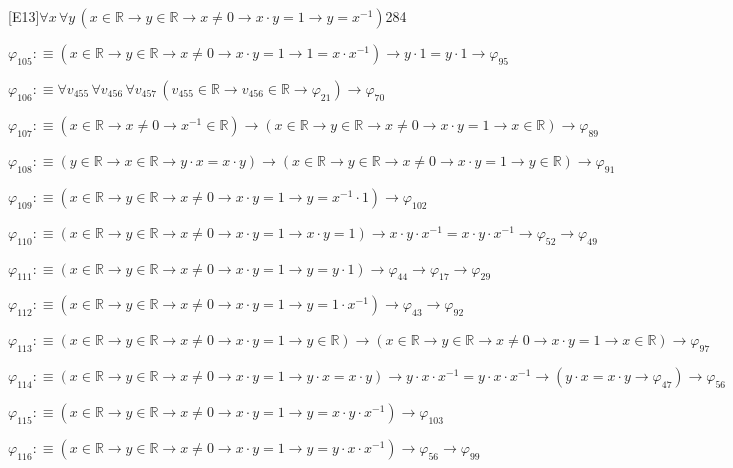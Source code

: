 \begin{fullproof}{[E13]}{$\forall x\,\forall y\,(x \in \mathbb{R} \to y \in \mathbb{R} \to x \neq 0 \to x \cdot y = 1 \to y = x^{-1})$}{284}
\begin{abbrevlist}
\item $\varphi_{105} :\equiv (x \in \mathbb{R} \to y \in \mathbb{R} \to x \neq 0 \to x \cdot y = 1 \to 1 = x \cdot x^{-1}) \to y \cdot 1 = y \cdot 1 \to \varphi_{95}$
\item $\varphi_{106} :\equiv \forall v_{455}\,\forall v_{456}\,\forall v_{457}\,(v_{455} \in \mathbb{R} \to v_{456} \in \mathbb{R} \to \varphi_{21}) \to \varphi_{70}$
\item $\varphi_{107} :\equiv (x \in \mathbb{R} \to x \neq 0 \to x^{-1} \in \mathbb{R}) \to (x \in \mathbb{R} \to y \in \mathbb{R} \to x \neq 0 \to x \cdot y = 1 \to x \in \mathbb{R}) \to \varphi_{89}$
\item $\varphi_{108} :\equiv (y \in \mathbb{R} \to x \in \mathbb{R} \to y \cdot x = x \cdot y) \to (x \in \mathbb{R} \to y \in \mathbb{R} \to x \neq 0 \to x \cdot y = 1 \to y \in \mathbb{R}) \to \varphi_{91}$
\item $\varphi_{109} :\equiv (x \in \mathbb{R} \to y \in \mathbb{R} \to x \neq 0 \to x \cdot y = 1 \to y = x^{-1} \cdot 1) \to \varphi_{102}$
\item $\varphi_{110} :\equiv (x \in \mathbb{R} \to y \in \mathbb{R} \to x \neq 0 \to x \cdot y = 1 \to x \cdot y = 1) \to x \cdot y \cdot x^{-1} = x \cdot y \cdot x^{-1} \to \varphi_{52} \to \varphi_{49}$
\item $\varphi_{111} :\equiv (x \in \mathbb{R} \to y \in \mathbb{R} \to x \neq 0 \to x \cdot y = 1 \to y = y \cdot 1) \to \varphi_{44} \to \varphi_{17} \to \varphi_{29}$
\item $\varphi_{112} :\equiv (x \in \mathbb{R} \to y \in \mathbb{R} \to x \neq 0 \to x \cdot y = 1 \to y = 1 \cdot x^{-1}) \to \varphi_{43} \to \varphi_{92}$
\item $\varphi_{113} :\equiv (x \in \mathbb{R} \to y \in \mathbb{R} \to x \neq 0 \to x \cdot y = 1 \to y \in \mathbb{R}) \to (x \in \mathbb{R} \to y \in \mathbb{R} \to x \neq 0 \to x \cdot y = 1 \to x \in \mathbb{R}) \to \varphi_{97}$
\item $\varphi_{114} :\equiv (x \in \mathbb{R} \to y \in \mathbb{R} \to x \neq 0 \to x \cdot y = 1 \to y \cdot x = x \cdot y) \to y \cdot x \cdot x^{-1} = y \cdot x \cdot x^{-1} \to (y \cdot x = x \cdot y \to \varphi_{47}) \to \varphi_{56}$
\item $\varphi_{115} :\equiv (x \in \mathbb{R} \to y \in \mathbb{R} \to x \neq 0 \to x \cdot y = 1 \to y = x \cdot y \cdot x^{-1}) \to \varphi_{103}$
\item $\varphi_{116} :\equiv (x \in \mathbb{R} \to y \in \mathbb{R} \to x \neq 0 \to x \cdot y = 1 \to y = y \cdot x \cdot x^{-1}) \to \varphi_{56} \to \varphi_{99}$
\end{abbrevlist}
\end{fullproof}
